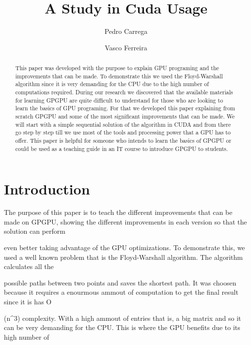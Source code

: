 \documentclass[runningheads]{llncs}
\begin{document}
\title{A Study in Cuda Usage}
\author{Pedro Carrega \and
Vasco Ferreira
}


\maketitle

\begin{abstract}
This paper was developed with the purpose to explain GPU programing and the improvements that can be made. To demonstrate this we used the Floyd-Warshall algorithm since it is very demanding for the CPU due to the high number of computations required. During our research we discovered that the available materials for learning GPGPU are quite difficult to understand for those who are looking to learn the basics of GPU programing. For that we developed this paper explaining from scratch GPGPU and some of the most significant improvements that can be made. We will start with a simple sequential solution of the algorithm in CUDA and from there go step by step till we use most of the tools and processing power that a GPU has to offer. This paper is helpful for someone who intends to learn the basics of GPGPU or could be used as a teaching guide in an IT course to introduce GPGPU to students.

\end{abstract}
%
%
%
\section{Introduction}

The purpose of this paper is to teach the different improvements that can be made on GPGPU, showing the different improvements in each version so that the solution can perform 

even better taking advantage of the GPU optimizations. To demonstrate this, we used a well known problem that is the Floyd-Warshall algorithm. The algorithm calculates all the 

possible paths between two points and saves the shortest path. It was choosen because it requires a enourmous ammout of computation to get the final result since it is has O

(n^3) complexity. With a high ammout of entries that is, a big matrix and so it can be very demanding for the CPU. This is where the GPU benefits due to its high number of 
\end{document}
